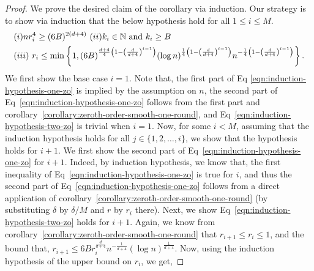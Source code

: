 \begin{proof}
We prove the desired claim of the corollary via induction. Our strategy is to 
show via induction that the below hypothesis hold for all 
$1\leq i \leq M$.
\begin{align}
&(i) nr_i^4 \geq(6B)^{2(d+4)}~
(ii)k_i \in \mathbb{N}~\text{and}~k_i \geq B	\label{eqn:induction-hypothesis-one-zo} \\
&(iii)~r_i \leq \min
	\left\{1, (6B)^{\frac{d+4}{4}\left(1-\left(\frac{d}{d+4}\right)^{i-1}\right)}
		(\log n)^{\frac{1}{4}\left(1-\left(\frac{d}{d+4}\right)^{i-1}\right)}
		n^{-\frac{1}{4}\left(1-\left(\frac{d}{d+4}\right)^{i-1}\right)}\right\}
\label{eqn:induction-hypothesis-two-zo}.
\end{align} 
We first show the base case $i=1$. Note that, the first part of Eq
\eqref{eqn:induction-hypothesis-one-zo} is implied by the assumption 
on $n$, the second part of Eq~\eqref{eqn:induction-hypothesis-one-zo}
follows from the first part and corollary~\ref{corollary:zeroth-order-smooth-one-round},
and Eq~\eqref{eqn:induction-hypothesis-two-zo} is trivial when $i=1$. 
Now, for some $i < M$, assuming that the induction hypothesis holds for 
all $j \in \{1, 2, \ldots, i\}$, we show that the hypothesis holds for $i+1$.  
We first show the second part of Eq~\eqref{eqn:induction-hypothesis-one-zo}
for $i+1$. Indeed, by induction hypothesis, we know that, the first 
inequality of Eq~\eqref{eqn:induction-hypothesis-one-zo} is true for $i$,
and thus the second part of Eq~\eqref{eqn:induction-hypothesis-one-zo}
follows from a direct application of corollary~\ref{corollary:zeroth-order-smooth-one-round}
(by substituting $\delta$ by $\delta/M$ and $r$ by $r_i$ there).  Next, 
we show Eq~\eqref{eqn:induction-hypothesis-two-zo} holds for $i+1$. 
Again, we know from corollary~\ref{corollary:zeroth-order-smooth-one-round} that
 $r_{i+1} \leq r_i \leq 1$, and the bound that, $
 r_{i+1} \leq 6B r_i^\frac{d}{d+4} n^{-\frac{1}{d+4}}\left(\log n\right)^\frac{1}{d+4}$.
 Now, using the induction hypothesis of the upper bound on $r_i$, we get, 

\end{proof}
